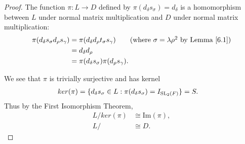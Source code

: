 \begin{proof} 
The function $\pi: L \rightarrow D$ defined by $\pi(d_\delta s_\sigma) = d_\delta$ is a homomorphism between $L$ under normal matrix multiplication and $D$ under normal matrix multiplication:
\begin{align*} \pi(d_\delta s_\sigma d_\rho s_\gamma) &= \pi(d_\delta d_\rho t_\sigma s_\gamma) \tag{where $\sigma = \lambda \rho^{2}$ by Lemma \ref{6.1}}
\\ &= d_\delta d_\rho
\\ &= \pi(d_\delta s_\sigma)\pi(d_\rho s_\gamma).
\end{align*}

We see that $\pi$ is trivially surjective and has kernel
\begin{align*}  ker(\pi) &= \{ d_\delta s_\sigma \in L : \pi(d_\delta s_\sigma) = I_{\operatorname{SL}_2(F)}\} = S.
\end{align*}
Thus by the First Isomorphism Theorem,
\begin{align*} L / ker(\pi) &\cong \text{Im}(\pi), \\
L / &\cong D.
\end{align*}

\end{proof}

